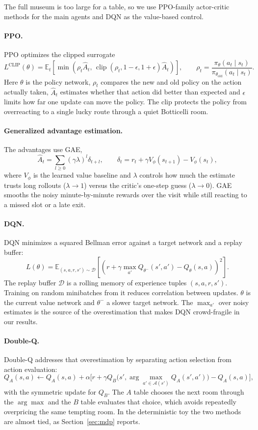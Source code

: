 \documentclass[11pt]{article}
\newcommand{\E}{\mathbb{E}}
\newcommand{\Acal}{\mathcal{A}}
\begin{document}
The full museum is too large for a table, so we use PPO-family actor-critic methods for the main agents
and DQN as the value-based control.

\paragraph{PPO.}
PPO \cite{schulman2017} optimizes the clipped surrogate
\[
L^{\text{CLIP}}(\theta)=
\E_t\left[
\min\left(\rho_t\hat A_t,\,
\operatorname{clip}(\rho_t,1-\epsilon,1+\epsilon)\hat A_t\right)
\right],
\qquad
\rho_t=\frac{\pi_\theta(a_t\mid s_t)}{\pi_{\theta_{\text{old}}}(a_t\mid s_t)}.
\]
Here $\theta$ is the policy network, $\rho_t$ compares the new and old policy on the action actually
taken, $\hat A_t$ estimates whether that action did better than expected and $\epsilon$ limits how far
one update can move the policy. The clip protects the policy from overreacting to a single lucky route
through a quiet Botticelli room.

\paragraph{Generalized advantage estimation.}
The advantages use GAE,
\[
\hat A_t=\sum_{l\ge0}(\gamma\lambda)^l\delta_{t+l},
\qquad
\delta_t=r_t+\gamma V_\phi(s_{t+1})-V_\phi(s_t),
\]
where $V_\phi$ is the learned value baseline and $\lambda$ controls how much the estimate trusts long
rollouts ($\lambda\to1$) versus the critic's one-step guess ($\lambda\to0$). GAE smooths the noisy
minute-by-minute rewards over the visit while still reacting to a missed slot or a late exit.

\paragraph{DQN.}
DQN \cite{mnih2015} minimizes a squared Bellman error against a target network and a replay buffer:
\[
L(\theta)=\E_{(s,a,r,s')\sim\mathcal{D}}
\left[
\left(r+\gamma\max_{a'}Q_{\theta^-}(s',a')-Q_\theta(s,a)\right)^2
\right].
\]
The replay buffer $\mathcal D$ is a rolling memory of experience tuples $(s,a,r,s')$. Training on
random minibatches from it reduces correlation between updates. $\theta$ is the current value network
and $\theta^-$ a slower target network. The $\max_{a'}$ over noisy estimates is the source of the
overestimation that makes DQN crowd-fragile in our results.

\paragraph{Double-Q.}
Double-Q \cite{sutton2018} addresses that overestimation by separating action selection from action evaluation:
\[
Q_A(s,a)\leftarrow Q_A(s,a)+\alpha\Big[
r+\gamma Q_B\big(s',\arg\max_{a'\in\Acal(s')}Q_A(s',a')\big)-Q_A(s,a)\Big],
\]
with the symmetric update for $Q_B$. The $A$ table chooses the next room through the $\arg\max$ and the
$B$ table evaluates that choice, which avoids repeatedly overpricing the same tempting room. In the
deterministic toy the two methods are almost tied, as Section~\ref{sec:mdp} reports.
\end{document}
